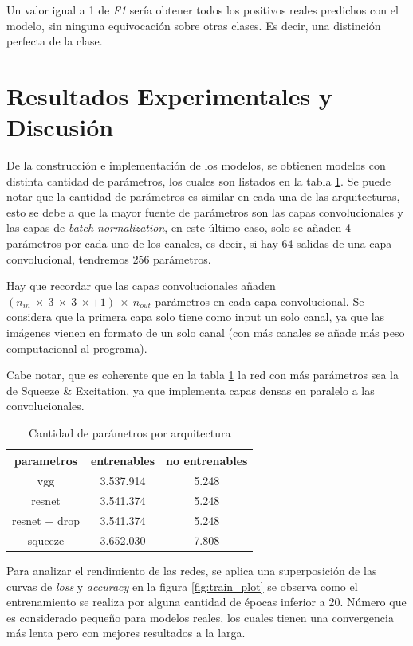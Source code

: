         Un valor igual a 1 de \textit{F1} sería obtener todos los positivos reales predichos con el modelo, sin ninguna equivocación sobre otras clases. Es decir, una distinción perfecta de la clase.
        
\section{Resultados Experimentales y Discusión}
    
    De la construcción e implementación de los modelos, se obtienen modelos con distinta cantidad de parámetros, los cuales son listados en la tabla \ref{tab:parametros}. Se puede notar que la cantidad de parámetros es similar en cada una de las arquitecturas, esto se debe a que la mayor fuente de parámetros son las capas convolucionales y las capas de \textit{batch normalization}, en este último caso, solo se añaden 4 parámetros por cada uno de los canales, es decir, si hay 64 salidas de una capa convolucional, tendremos 256 parámetros.
    
    Hay que recordar que las capas convolucionales añaden $(n_{in} \ \times \ 3 \ \times \  3 \ \times + 1) \ \times \ n_{out}$ parámetros en cada capa convolucional. Se considera que la primera capa solo tiene como input un solo canal, ya que las imágenes vienen en formato de un solo canal (con más canales se añade más peso computacional al programa).
    
    Cabe notar, que es coherente que en la tabla \ref{tab:parametros} la red con más parámetros sea la de Squeeze \& Excitation, ya que implementa capas densas en paralelo a las convolucionales.
    
    \begin{table}[t]
        \centering
        \begin{tabular}{c|cc}
             parametros & entrenables & no entrenables \\ \hline
            vgg & 3.537.914 & 5.248 \\
            resnet & 3.541.374 & 5.248 \\
            resnet + drop & 3.541.374 & 5.248 \\
            squeeze & 3.652.030 & 7.808 \\
        \end{tabular}
        \caption{Cantidad de parámetros por arquitectura}
        \label{tab:parametros}
    \end{table}
    
    Para analizar el rendimiento de las redes, se aplica una superposición de las curvas de \textit{loss} y \textit{accuracy} en la figura \ref{fig:train_plot} se observa como el entrenamiento se realiza por alguna cantidad de épocas inferior a 20. Número que es considerado pequeño para modelos reales, los cuales tienen una convergencia más lenta pero con mejores resultados a la larga.
    
